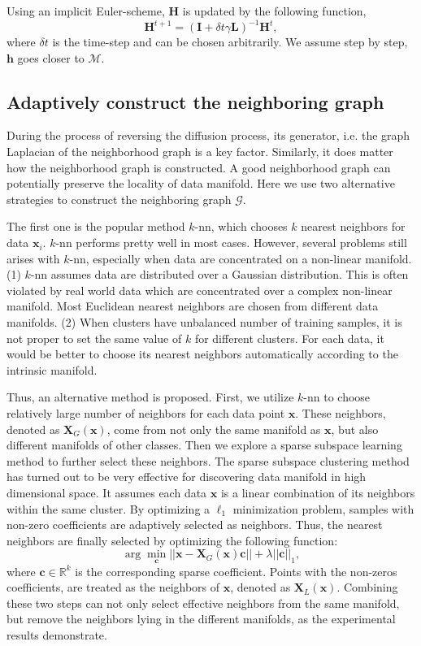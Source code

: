 \documentclass{article}
\def \ccc{\mathbf c}
\def \x{\mathbf x}
\def \h{\mathbf h}
\def \HH{\mathbf H}
\def \LL{\mathbf L}
\def \I{\mathbf I}
\def \X{\mathbf X}
\def \MM{{\mathcal M}}
\def \GM{{\mathcal G}}
\begin{document}
Using an implicit Euler-scheme, $\HH$ is updated by the following function,
\begin{equation}
  \HH^{t+1} = (\I + \delta t \gamma \LL )^{-1} \HH^t,
  \label{eq:diffusion}
\end{equation}
where $\delta t$ is the time-step and can be chosen arbitrarily.  We assume step by step, $\h$  goes closer to $\MM$.

\subsection{Adaptively construct the neighboring graph }
\label{section:graph}
During the process of reversing the diffusion process, its generator, i.e. the graph Laplacian of the neighborhood graph is a key factor.  Similarly, it does matter how the neighborhood graph is constructed. A good neighborhood graph can potentially preserve the locality of data manifold. Here we use two alternative strategies to construct the neighboring graph $\GM$.

The first one is the popular method $k$-nn, which chooses $k$ nearest neighbors for data $\x_i$.  $k$-nn performs pretty well in most cases. However, several problems still arises with $k$-nn, especially when data are concentrated on a non-linear manifold.  (1) $k$-nn assumes data are distributed over a Gaussian distribution. This is often violated by real world data which are concentrated over a complex non-linear manifold. Most Euclidean nearest neighbors are chosen from different data manifolds. (2) When clusters have unbalanced number of training samples, it is not proper to set the same value of $k$ for different clusters.  For each data, it would be better to choose its  nearest neighbors automatically according to the intrinsic manifold.

Thus, an alternative method is proposed.  First, we utilize $k$-nn to choose relatively large number of neighbors for each data point $\x$. These neighbors, denoted as $\X_G(\x)$, come from not only the same manifold as $\x$, but also different manifolds of other classes. Then we explore a sparse subspace learning method \cite{DBLP:journals/corr/abs-1203-1005}  to further select these neighbors. The sparse subspace clustering method has turned out to be very effective for discovering data manifold in high dimensional space. It assumes each data $\x$ is a linear combination of its neighbors within the same cluster. By optimizing a $\ell_1$ minimization problem, samples with non-zero coefficients are adaptively selected as neighbors.  Thus,  the nearest neighbors are finally selected by optimizing the following function:
\begin{equation}
    \arg \min_{\ccc} ||\x- \X_G(\x) \ccc|| + \lambda ||\ccc||_1,
    \label{eq:neighbor}
\end{equation}
where $\ccc \in \mathbb{R}^k$ is the corresponding sparse coefficient. Points with the non-zeros coefficients, are treated as the neighbors of $\x$, denoted as $\X_L(\x)$. Combining these two steps can not only select effective neighbors from the same manifold, but remove the neighbors lying in the different manifolds, as the experimental results demonstrate.
\end{document}
